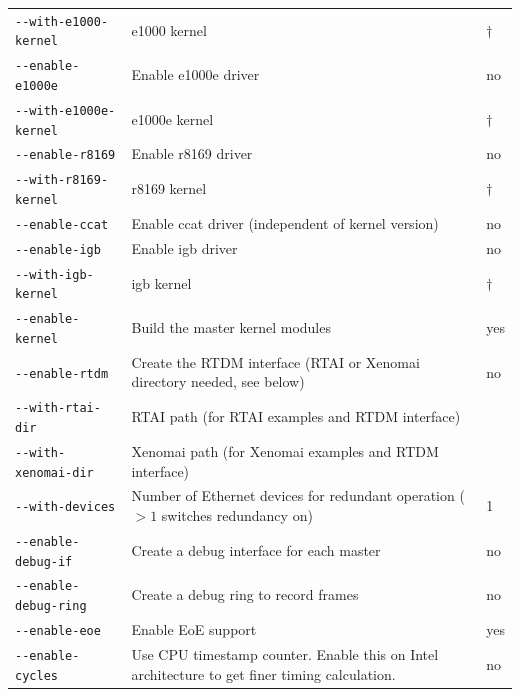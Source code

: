 \documentclass[a4paper,12pt,BCOR6mm,bibtotoc,idxtotoc]{scrbook}
\begin{document}
\begin{longtable}{l|p{}|l}
\lstinline+--with-e1000-kernel+ & e1000 kernel & $\dagger$\\

\lstinline+--enable-e1000e+ & Enable e1000e driver & no\\

\lstinline+--with-e1000e-kernel+ & e1000e kernel & $\dagger$\\

\lstinline+--enable-r8169+ & Enable r8169 driver & no\\

\lstinline+--with-r8169-kernel+ & r8169 kernel & $\dagger$\\

\lstinline+--enable-ccat+ & Enable ccat driver (independent of kernel version)
& no\\

\lstinline+--enable-igb+ & Enable igb driver & no\\

\lstinline+--with-igb-kernel+ & igb kernel & $\dagger$\\

\hline

\lstinline+--enable-kernel+ & Build the master kernel modules & yes\\

\lstinline+--enable-rtdm+ & Create the RTDM interface (RTAI or Xenomai
directory needed, see below) & no\\

\lstinline+--with-rtai-dir+ & RTAI path (for RTAI examples and RTDM interface)
& \\

\lstinline+--with-xenomai-dir+ & Xenomai path (for Xenomai examples and RTDM
interface) & \\

\lstinline+--with-devices+ & Number of Ethernet devices for redundant
operation ($>1$ switches redundancy on) & 1\\

\lstinline+--enable-debug-if+ & Create a debug interface for each master & no\\

\lstinline+--enable-debug-ring+ & Create a debug ring to record frames & no\\

\lstinline+--enable-eoe+ & Enable EoE support & yes\\

\lstinline+--enable-cycles+ & Use CPU timestamp counter. Enable this on Intel
architecture to get finer timing calculation. & no\\


\end{longtable}
\end{document}
